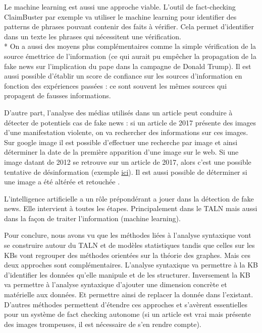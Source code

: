 Le machine learning est aussi une approche viable. L'outil de fact-checking ClaimBuster par exemple va utiliser le machine learning pour identifier des patterns de phrases pouvant contenir des faits à vérifier. Cela permet d'identifier dans un texte les phrases qui nécessitent une vérification. 
\\*
On a aussi des moyens plus complémentaires comme la simple vérification de la source émettrice de l'information (ce qui aurait pu empêcher la propagation de la fake news sur l'implication du pape dans la campagne  de Donald Trump). Il est aussi possible d'établir un score de confiance sur les sources d'information en fonction des expériences passées : ce sont souvent les mêmes sources qui propagent de fausses informations.

D'autre part, l'analyse des médias utilisés dans un article peut conduire à détecter de potentiels cas de fake news : si un article de 2017 présente des images d'une manifestation violente, on va rechercher des informations sur ces images. Sur google image il est possible d'effectuer une recherche par image et ainsi déterminer la date de la première apparition d'une image sur le web. Si une image datant de 2012 se retrouve sur un article de 2017, alors c'est une possible tentative de désinformation (exemple \href{https://www.lemonde.fr/les-decodeurs/article/2017/10/02/violences-policieres-en-catalogne-attention-aux-images-trompeuses_5194905_4355770.html}{ici}). Il est aussi possible de déterminer si une image a été altérée et retouchée \cite{krawetz2007picture}.

L'intelligence artificielle a un rôle prépondérant a jouer dans la détection de fake news. Elle intervient à toutes les étapes. Principalement dans le TALN mais aussi dans la façon de traiter l'information (machine learning).

Pour conclure, nous avons vu que les méthodes liées à l'analyse syntaxique vont se construire autour du TALN et de modèles statistiques tandis que celles sur les KBs vont regrouper des méthodes orientées sur la théorie des graphes. Mais ces deux approches sont complémentaires. L'analyse syntaxique va permettre à la KB d'identifier les données qu'elle manipule et de les structurer. Inversement la KB va permettre à l'analyse syntaxique d'ajouter une dimension concrète et matérielle aux données. Et permettre ainsi de replacer la donnée dans l'existant. D'autres méthodes permettent d'étendre ces approches et s'avèrent essentielles pour un système de fact checking autonome (si un article est vrai mais présente des images trompeuses, il est nécessaire de s'en rendre compte).

